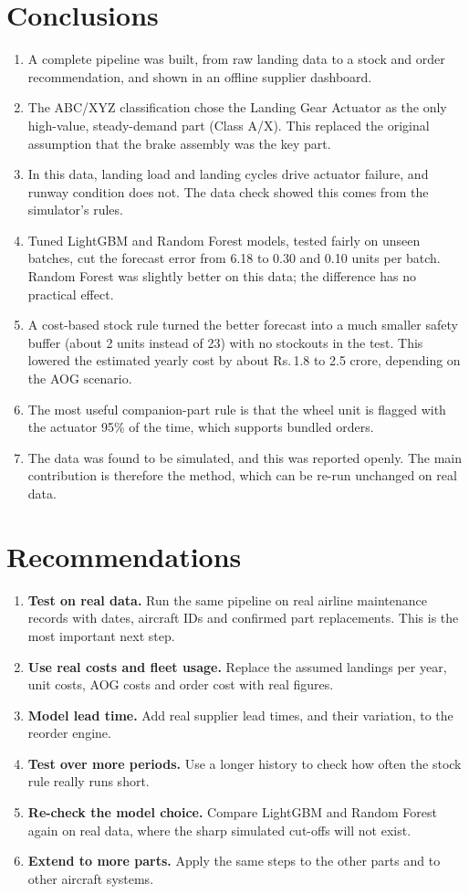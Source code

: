 \documentclass[12pt,oneside]{report}
\newcommand{\INR}{Rs.\,}
\begin{document}
\section{Conclusions}
\begin{enumerate}
\item A complete pipeline was built, from raw landing data to a stock and order recommendation, and shown in an offline supplier dashboard.
\item The ABC/XYZ classification chose the Landing Gear Actuator as the only high-value, steady-demand part (Class A/X). This replaced the original assumption that the brake assembly was the key part.
\item In this data, landing load and landing cycles drive actuator failure, and runway condition does not. The data check showed this comes from the simulator's rules.
\item Tuned LightGBM and Random Forest models, tested fairly on unseen batches, cut the forecast error from 6.18 to 0.30 and 0.10 units per batch. Random Forest was slightly better on this data; the difference has no practical effect.
\item A cost-based stock rule turned the better forecast into a much smaller safety buffer (about 2 units instead of 23) with no stockouts in the test. This lowered the estimated yearly cost by about \INR 1.8 to 2.5 crore, depending on the AOG scenario.
\item The most useful companion-part rule is that the wheel unit is flagged with the actuator 95\% of the time, which supports bundled orders.
\item The data was found to be simulated, and this was reported openly. The main contribution is therefore the method, which can be re-run unchanged on real data.
\end{enumerate}

\section{Recommendations}
\begin{enumerate}
\item \textbf{Test on real data.} Run the same pipeline on real airline maintenance records with dates, aircraft IDs and confirmed part replacements. This is the most important next step.
\item \textbf{Use real costs and fleet usage.} Replace the assumed landings per year, unit costs, AOG costs and order cost with real figures.
\item \textbf{Model lead time.} Add real supplier lead times, and their variation, to the reorder engine.
\item \textbf{Test over more periods.} Use a longer history to check how often the stock rule really runs short.
\item \textbf{Re-check the model choice.} Compare LightGBM and Random Forest again on real data, where the sharp simulated cut-offs will not exist.
\item \textbf{Extend to more parts.} Apply the same steps to the other parts and to other aircraft systems.
\end{enumerate}
\end{document}
